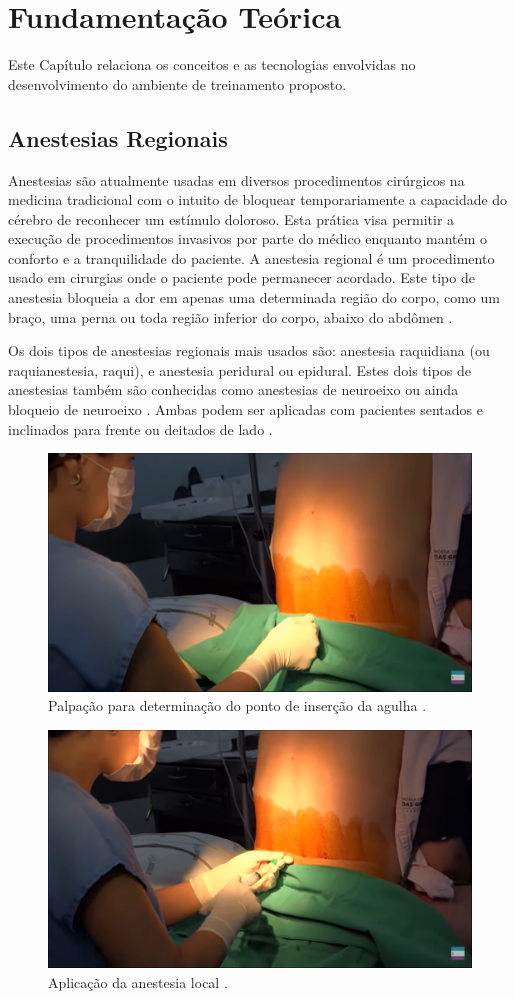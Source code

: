 \chapter{Fundamentação Teórica} \label{cap:cap2}

Este Capítulo relaciona os conceitos e as tecnologias envolvidas no desenvolvimento do ambiente de treinamento proposto. 

\section{Anestesias Regionais}

Anestesias são atualmente usadas em diversos procedimentos cirúrgicos na medicina tradicional com o intuito de bloquear temporariamente a capacidade do cérebro de reconhecer um estímulo doloroso. Esta prática visa permitir a execução de procedimentos invasivos por parte do médico enquanto mantém o conforto e a tranquilidade do paciente. A anestesia regional é um procedimento usado em cirurgias onde o paciente pode permanecer acordado. Este tipo de anestesia bloqueia a dor em apenas uma determinada região do corpo, como um braço, uma perna ou toda região inferior do corpo, abaixo do abdômen \cite{Pinheiro2018}.

Os dois tipos de anestesias regionais mais usados são: anestesia raquidiana (ou raquianestesia, raqui), e anestesia peridural ou epidural. Estes dois tipos de anestesias também são conhecidas como anestesias de neuroeixo ou ainda bloqueio de neuroeixo \cite{Pinheiro2018}. Ambas podem ser aplicadas com pacientes sentados e inclinados para frente ou deitados de lado \cite{Anesclin2019}. 

\begin{figure}[ht!]
    \centering
    \includegraphics[width=0.6\linewidth]{capitulos/figuras/0.marcacaoPonto.png}
    \caption{Palpação para determinação do ponto de inserção da agulha \cite{Londero2018}.}
    \label{fig:marcacaoPonto}
\end{figure}

\begin{figure}[ht!]
    \centering
    \includegraphics[width=0.6\linewidth]{capitulos/figuras/1.AnestesiaLocal.png}
    \caption{Aplicação da anestesia local \cite{Londero2018}.}
    \label{fig:anestesiaLocal}
\end{figure}


